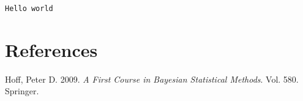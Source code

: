 \documentclass[
  letterpaper,
  DIV=11,
  numbers=noendperiod]{scrreprt}
\newlength{\cslhangindent}
\newlength{\cslentryspacingunit} %
\newenvironment{CSLReferences}[2] %
 {%
  \setlength{\parindent}{0pt}
  \ifodd #1
  \let\oldpar\par
  \def\par{\hangindent=\cslhangindent\oldpar}
  \fi
  \setlength{\parskip}{#2\cslentryspacingunit}
 }%
 {}
\begin{document}
\begin{verbatim}
Hello world
\end{verbatim}


\hypertarget{references-1}{%
\chapter*{References}\label{references-1}}

\hypertarget{refs}{}
\begin{CSLReferences}{1}{0}
\leavevmode{}%
Hoff, Peter D. 2009. \emph{A First Course in Bayesian Statistical
Methods}. Vol. 580. Springer.

\end{CSLReferences}
\end{document}
